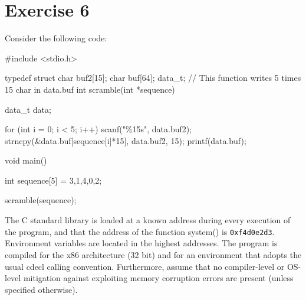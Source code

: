 \section{Exercise 6}

Consider the following code: 
\begin{verbnobox}[\verbarg]
#include <stdio.h>

typedef struct 
{
    char buf2[15];
    char buf[64];
} data_t;
// This function writes 5 times 15 char in data.buf
int scramble(int *sequence) 
{
    data_t data;

    for (int i = 0; i < 5; i++)
    {
        scanf("\%15s", data.buf2);
        strncpy(&data.buf[sequence[i]*15], data.buf2, 15);
        printf(data.buf);
    }
}

void main() 
{
    int sequence[5] = {3,1,4,0,2};

    scramble(sequence);
}
\end{verbnobox}
The C standard library is loaded at a known address during every execution of the program, and that the address of the function system() is \texttt{0xf4d0e2d3}.
Environment variables are located in the highest addresses. 
The program is compiled for the x86 architecture (32 bit) and for an environment that adopts the usual cdecl calling convention. 
Furthermore, assume that no compiler-level or OS-level mitigation against exploiting memory corruption errors are present (unless specified otherwise).

